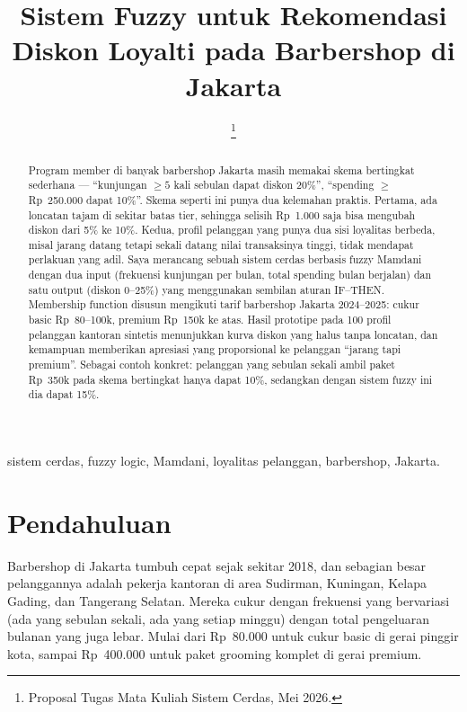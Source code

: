 \documentclass[conference]{IEEEtran}
\begin{document}
\title{Sistem Fuzzy untuk Rekomendasi Diskon Loyalti pada Barbershop di Jakarta}

\author{%
\thanks{Proposal Tugas Mata Kuliah Sistem Cerdas, Mei 2026.}
}

\maketitle

\begin{abstract}
Program member di banyak barbershop Jakarta masih memakai skema bertingkat sederhana
--- ``kunjungan $\geq 5$ kali sebulan dapat diskon 20\%'', ``spending $\geq$ Rp~250.000
dapat 10\%''. Skema seperti ini punya dua kelemahan praktis. Pertama, ada
loncatan tajam di sekitar batas tier, sehingga selisih Rp~1.000 saja bisa
mengubah diskon dari 5\% ke 10\%. Kedua, profil pelanggan yang punya dua sisi
loyalitas berbeda, misal jarang datang tetapi sekali datang nilai
transaksinya tinggi, tidak mendapat perlakuan yang adil. Saya merancang
sebuah sistem cerdas berbasis fuzzy Mamdani dengan dua input (frekuensi
kunjungan per bulan, total spending bulan berjalan) dan satu output (diskon
0--25\%) yang menggunakan sembilan aturan IF--THEN. Membership function disusun
mengikuti tarif barbershop Jakarta 2024--2025: cukur basic Rp~80--100k, premium
Rp~150k ke atas. Hasil prototipe pada 100 profil pelanggan kantoran sintetis
menunjukkan kurva diskon yang halus tanpa loncatan, dan kemampuan memberikan
apresiasi yang proporsional ke pelanggan ``jarang tapi premium''. Sebagai
contoh konkret: pelanggan yang sebulan sekali ambil paket Rp~350k pada skema
bertingkat hanya dapat 10\%, sedangkan dengan sistem fuzzy ini dia dapat 15\%.
\end{abstract}

\begin{IEEEkeywords}
sistem cerdas, fuzzy logic, Mamdani, loyalitas pelanggan, barbershop, Jakarta.
\end{IEEEkeywords}

\section{Pendahuluan}
Barbershop di Jakarta tumbuh cepat sejak sekitar 2018, dan sebagian besar
pelanggannya adalah pekerja kantoran di area Sudirman, Kuningan, Kelapa
Gading, dan Tangerang Selatan. Mereka cukur dengan frekuensi yang
bervariasi (ada yang sebulan sekali, ada yang setiap minggu) dengan total
pengeluaran bulanan yang juga lebar. Mulai dari Rp~80.000 untuk cukur basic
di gerai pinggir kota, sampai Rp~400.000 untuk paket grooming komplet di
gerai premium.
\end{document}
